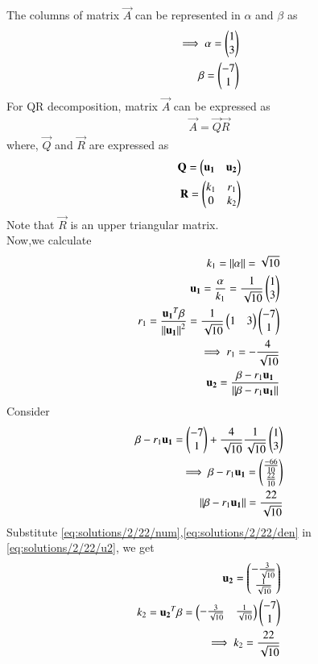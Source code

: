 The columns of matrix $\vec{A}$ can be represented in $\alpha$ and $\beta$ as
\begin{align}
    \implies\alpha=\begin{pmatrix}1 \\ 3\end{pmatrix}\\
    \beta=\begin{pmatrix}-7\\ 1\end{pmatrix}
\end{align}
For QR decomposition, matrix $\vec{A}$ can be expressed as
\begin{align}
    \vec{A}=\vec{Q}\vec{R}\label{eq:solutions/2/22/decomp}
\end{align}
where, $\vec{Q}$ and $\vec{R}$ are expressed as
\begin{align}
    \mathbf{Q}=\begin{pmatrix}\mathbf{u_1} & \mathbf{u_2}\end{pmatrix}\label{eq:solutions/2/22/Q}\\
    \mathbf{R}=\begin{pmatrix}k_1 & r_1 \\ 0 & k_2\end{pmatrix}\label{eq:solutions/2/22/R}
\end{align}
Note that $\vec{R}$ is an upper triangular matrix.\\
Now,we calculate
\begin{align}
    k_1=\left\lVert\alpha\right\rVert=\sqrt{10}\\
    \mathbf{u_1}=\frac{\alpha}{k_1}=\frac{1}{\sqrt{10}}\begin{pmatrix}1 \\ 3\end{pmatrix}\\
    r_1=\frac{\mathbf{u_1}^T\beta}{\left\lVert\mathbf{u_1}\right\rVert^2}=\frac{1}{\sqrt{10}}\begin{pmatrix}1 & 3\end{pmatrix}\begin{pmatrix}-7 \\ 1\end{pmatrix}\\
    \implies r_1=-\frac{4}{\sqrt{10}}\\
    \mathbf{u_2}=\frac{\beta-r_1\mathbf{u_1}}{\left\lVert\beta-r_1\mathbf{u_1}\right\rVert}\label{eq:solutions/2/22/u2}
\end{align}
Consider
\begin{align}
    \beta-r_1\mathbf{u_1}=\begin{pmatrix}-7 \\ 1\end{pmatrix}+\frac{4}{\sqrt{10}}\frac{1}{\sqrt{10}}\begin{pmatrix}1 \\ 3\end{pmatrix}\\
    \implies\beta-r_1\mathbf{u_1}=\begin{pmatrix}\frac{-66}{10}\\\frac{22}{10}\end{pmatrix}\label{eq:solutions/2/22/num}\\
    \left\lVert\beta-r_1\mathbf{u_1}\right\rVert=\frac{{22}}{\sqrt{10}}\label{eq:solutions/2/22/den}
\end{align}
Substitute \eqref{eq:solutions/2/22/num},\eqref{eq:solutions/2/22/den} in \eqref{eq:solutions/2/22/u2}, we get
\begin{align}
    \mathbf{u_2}=\begin{pmatrix}-\frac{3}{\sqrt{10}} \\ \frac{1}{\sqrt{10}}\end{pmatrix}\\
    k_2=\mathbf{u_2}^T\beta=\begin{pmatrix}-\frac{3}{\sqrt{10}} & \frac{1}{\sqrt{10}}\end{pmatrix}\begin{pmatrix}-7 \\ 1\end{pmatrix}\\
    \implies k_2=\frac{22}{\sqrt{10}}
\end{align}
